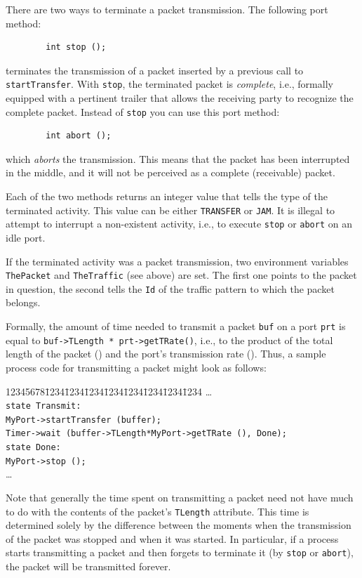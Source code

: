 There are two ways to terminate a packet transmission.
The following port method:
\begin{verbatim}
        int stop ();
\end{verbatim}
terminates the transmission of a packet inserted by a previous call to
{\tt startTransfer}.
With {\tt stop}, the terminated packet is {\em complete}, i.e., formally
equipped with a pertinent trailer that allows the receiving party to
recognize the complete packet.
Instead of {\tt stop} you can use this port method:
\begin{verbatim}
        int abort ();
\end{verbatim}
which {\em aborts\/} the transmission.
This means that the packet has been interrupted in the middle, and it will not
be perceived as a complete (receivable) packet.

Each of the two methods returns an integer value that tells
the type of the terminated activity.
This value can be either {\tt TRANSFER} or {\tt JAM}.
It is illegal to attempt to interrupt a non-existent activity, i.e., to
execute {\tt stop} or {\tt abort} on an idle port.

If the terminated activity was a packet transmission, two environment
variables {\tt ThePacket} and {\tt TheTraffic} (see above) are set.
The first one points to the packet in question, the second tells
the {\tt Id} of the traffic pattern to which the packet belongs.

\medskip

Formally, the amount of time needed to transmit a packet {\tt buf} on a port
{\tt prt} is equal to {\tt buf->TLength~*~prt->getTRate()}, i.e., to the
product of the total length of the packet ()
and the port's transmission rate ().
Thus, a sample process code for transmitting a packet might look as
follows:
{\tt\begin{tabbing}
12345678\=1234\=1234\=1234\=1234\=1234\=1234\=1234\=1234\kill
\> \ldots \\
\> {\tt state Transmit:}\\
\> \> {\tt MyPort->startTransfer (buffer);}\\
\> \> {\tt Timer->wait (buffer->TLength*MyPort->getTRate (), Done);}\\
\> {\tt state Done:}\\
\> \> {\tt MyPort->stop ();}\\
\> \>\ldots
\end{tabbing}}

Note that generally the time spent on transmitting a packet need not have
much to do with the contents of the packet's {\tt TLength} attribute.
This time is determined solely by the difference between the moments when the
transmission of the packet was stopped and when it was started.
In particular, if a process starts transmitting a packet and then forgets
to terminate it (by {\tt stop} or {\tt abort}), the packet will be
transmitted forever.

